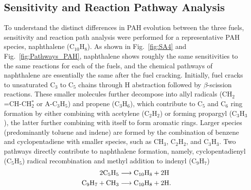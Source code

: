 \documentclass[review,3p,times]{elsarticleUS}
\begin{document}
\subsection{Sensitivity and Reaction Pathway Analysis}

To understand the distinct differences in PAH evolution between the three fuels, sensitivity and reaction path analysis were performed for a representative PAH species, naphthalene (C$_{10}$H$_8$).  As shown in Fig.~\ref{fig:SA4} and Fig.~\ref{fig:Pathways_PAH}, naphthalene shows roughly the same sensitivities to the same reactions for each of the fuels, and the chemical pathways of naphthalene are essentially the same after the fuel cracking. Initially, fuel cracks to unsaturated C$_3$ to C$_5$ chains through H abstraction followed by $\beta$-scission reactions. These smaller molecules further decompose into allyl radicals (CH$_2$=CH-CH$_2^*$ or A-C$_3$H$_5$) and propene (C$_3$H$_6$), which contribute to C$_5$ and C$_6$ ring formation by either combining with acetylene (C$_2$H$_2$) or forming propargyl (C$_3$H$_3$), the latter further combining with itself to form aromatic rings. Larger species (predominantly toluene and indene) are formed by the combination of benzene and cyclopentadiene with smaller species, such as 
CH$_3$, C$_2$H$_2$, and C$_3$H$_3$. Two pathways directly contribute to naphthalene formation, namely, cyclopentadienyl (C$_5$H$_5$) radical recombination and methyl addition to indenyl (C$_9$H$_7$)
\begin{align*}
  2 {\rm C}_5{\rm H}_5 &\longrightarrow {\rm C}_{10}{\rm H}_8 + 2 {\rm H}\\
  {\rm C}_9{\rm H}_7 + {\rm C}{\rm H}_3 &\longrightarrow {\rm C}_{10}{\rm H}_8 + 2 {\rm H}.
\end{align*}
\end{document}
